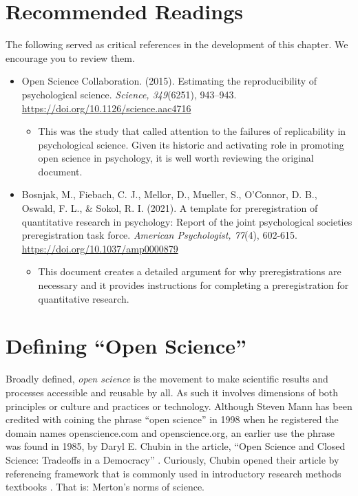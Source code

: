 \documentclass[
  11pt,
]{book}
\providecommand{\tightlist}{%
  \setlength{\itemsep}{0pt}\setlength{\parskip}{0pt}}
\begin{document}
\hypertarget{recommended-readings-1}{%
\section{Recommended Readings}\label{recommended-readings-1}}

The following served as critical references in the development of this chapter. We encourage you to review them.

\begin{itemize}
\tightlist
\item
  Open Science Collaboration. (2015). Estimating the reproducibility of psychological science. \emph{Science, 349}(6251), 943--943. \url{https://doi.org/10.1126/science.aac4716}

  \begin{itemize}
  \tightlist
  \item
    This was the study that called attention to the failures of replicability in psychological science. Given its historic and activating role in promoting open science in psychology, it is well worth reviewing the original document.
  \end{itemize}
\item
  Bosnjak, M., Fiebach, C. J., Mellor, D., Mueller, S., O'Connor, D. B., Oswald, F. L., \& Sokol, R. I. (2021). A template for preregistration of quantitative research in psychology: Report of the joint psychological societies preregistration task force. \emph{American Psychologist, 77}(4), 602-615. \url{https://doi.org/10.1037/amp0000879}

  \begin{itemize}
  \tightlist
  \item
    This document creates a detailed argument for why preregistrations are necessary and it provides instructions for completing a preregistration for quantitative research.
  \end{itemize}
\end{itemize}

\hypertarget{defining-open-science}{%
\section{Defining ``Open Science''}\label{defining-open-science}}

Broadly defined, \emph{open science} is the movement to make scientific results and processes accessible and reusable by all. As such it involves dimensions of both principles or culture and practices or technology. Although Steven Mann has been credited with coining the phrase ``open science'' in 1998 when he registered the domain names openscience.com and openscience.org, an earlier use the phrase was found in 1985, by Daryl E. Chubin in the article, ``Open Science and Closed Science: Tradeoffs in a Democracy'' \citep{noauthor_open_2022}. Curiously, Chubin opened their article by referencing framework that is commonly used in introductory research methods textbooks \citep[e.g.,][]{krathwohl_methods_2009}. That is: Merton's norms of science.
\end{document}
